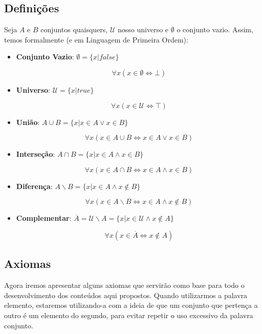 \subsection{Definições}

Seja $A$ e $B$ conjuntos quaisquers, $\mathcal{U}$ nosso universo e $\emptyset$ o conjunto vazio. Assim, temos formalmente (e em Linguagem de Primeira Ordem):

\begin{itemize}
\item \textbf{Conjunto Vazio}: $\emptyset = \{x | false\}$

\[\forall x (x \in \emptyset \iff \bot)\]

\qquad

\item \textbf{Universo}: $\mathcal{U} = \{x | true \}$

\[\forall x (x \in \mathcal{U} \iff \top)\]

\qquad

\item \textbf{União}: $A \cup B = \{x | x \in A \vee x \in B\}$

\[\forall x (x \in A \cup B \iff x \in A \vee x \in B)\]

\qquad

\item \textbf{Interseção}: $A \cap B = \{x | x \in A \wedge x \in B\}$

\[\forall x (x \in A \cap B \iff x \in A \wedge x \in B)\]

\qquad

\item \textbf{Diferença}: $A \backslash B = \{x | x \in A \wedge x \notin B\}$

\[\forall x (x \in A \backslash B \iff x \in A \wedge x \notin B)\]

\qquad

\item \textbf{Complementar}: $\overline A = \mathcal{U} \backslash A = \{x | x \in \mathcal{U} \land x \notin A\}$

\[\forall x (x \in \overline A \iff x \notin A)\]
\end{itemize} 

\subsection{Axiomas}
Agora iremos apresentar alguns axiomas que servirão como base para todo o desenvolvimento dos conteúdos aqui propostos. Quando utilizarmos a palavra elemento, estaremos utilizando-a com a ideia de que um conjunto que pertença a outro é um elemento do segundo, para evitar repetir o uso excessivo da palavra conjunto.

